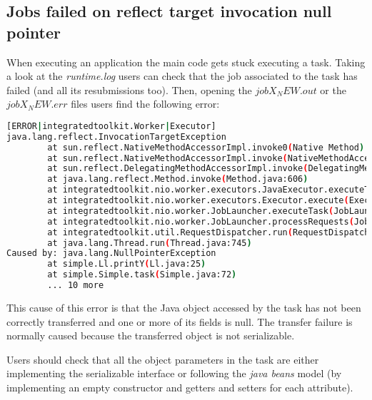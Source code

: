 \subsection{Jobs failed on reflect target invocation null pointer}
When executing an application the main code gets stuck executing a task. Taking a look at the \textit{runtime.log} users can check
that the job associated to the task has failed (and all its resubmissions too). Then, opening the \textit{$jobX_NEW.out$} or the
\textit{$jobX_NEW.err$} files users find the following error:

\begin{lstlisting}[language=bash]
[ERROR|integratedtoolkit.Worker|Executor]
java.lang.reflect.InvocationTargetException
        at sun.reflect.NativeMethodAccessorImpl.invoke0(Native Method)
        at sun.reflect.NativeMethodAccessorImpl.invoke(NativeMethodAccessorImpl.java:57)
        at sun.reflect.DelegatingMethodAccessorImpl.invoke(DelegatingMethodAccessorImpl.java:43)
        at java.lang.reflect.Method.invoke(Method.java:606)
        at integratedtoolkit.nio.worker.executors.JavaExecutor.executeTask(JavaExecutor.java:154)
        at integratedtoolkit.nio.worker.executors.Executor.execute(Executor.java:42)
        at integratedtoolkit.nio.worker.JobLauncher.executeTask(JobLauncher.java:46)
        at integratedtoolkit.nio.worker.JobLauncher.processRequests(JobLauncher.java:34)
        at integratedtoolkit.util.RequestDispatcher.run(RequestDispatcher.java:46)
        at java.lang.Thread.run(Thread.java:745)
Caused by: java.lang.NullPointerException
        at simple.Ll.printY(Ll.java:25)
        at simple.Simple.task(Simple.java:72)
        ... 10 more
\end{lstlisting}

This cause of this error is that the Java object accessed by the task has not been correctly transferred and one or more of its fields
is null. The transfer failure is normally caused because the transferred object is not serializable. 

Users should check that all the object parameters in the task are either implementing the serializable interface or following 
the \textit{java beans} model (by implementing an empty constructor and getters and setters for each attribute).

